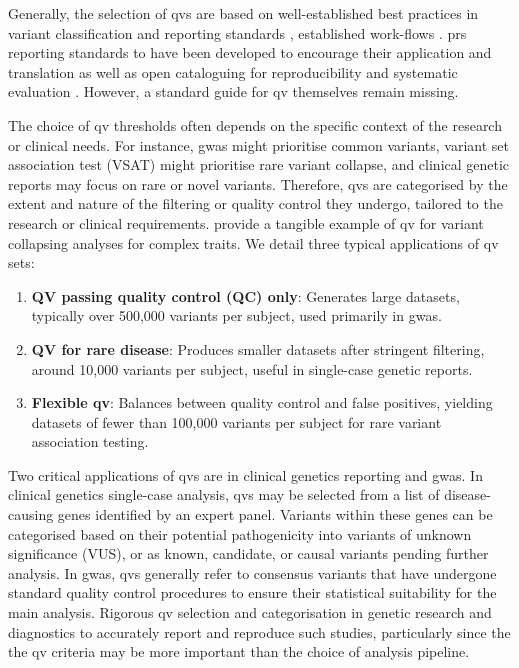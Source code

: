 Generally, the selection of \ac{qv}s are based on well-established best practices
 in variant classification and reporting standards
\cite{richards2015standards, li2017standards, li2017intervar,riggs2020technical}, 
established work-flows 
\cite{pedersen2021effective,anderson2010data,uffelmann2021genome}.
\ac{prs} reporting standards to have been developed to encourage their application and translation as well as open cataloguing for reproducibility and systematic evaluation
\cite{wand2021improving, lambert2021polygenic}.
However, a standard guide for \ac{qv} themselves remain missing.

The choice of \ac{qv} thresholds often depends on the specific context of the research or clinical needs. 
For instance, \ac{gwas} might prioritise common variants, 
variant set association test (VSAT) might prioritise rare variant collapse, 
and clinical genetic reports may focus on rare or novel variants. 
Therefore, \ac{qv}s are categorised by the extent and nature of the filtering or quality control they undergo, tailored to the research or clinical requirements. 
\citet{povysil2019rare} provide a tangible example of \ac{qv} for variant collapsing analyses for complex traits.
We detail three typical applications of \ac{qv} sets:

\begin{enumerate}
    \item \textbf{QV passing quality control (QC) only}: Generates large datasets, typically over 500,000 variants per subject, used primarily in \ac{gwas}.
    \item \textbf{QV for rare disease}: Produces smaller datasets after stringent filtering, around 10,000 variants per subject, useful in single-case genetic reports.
    \item \textbf{Flexible \ac{qv}}: Balances between quality control and false positives, yielding datasets of fewer than 100,000 variants per subject for rare variant association testing.
\end{enumerate}

Two critical applications of  \ac{qv}s are in clinical genetics reporting and \ac{gwas}. 
In clinical genetics single-case analysis, \ac{qv}s may be selected from a list of disease-causing genes identified by an expert panel. 
Variants within these genes can be categorised based on their potential pathogenicity into variants of unknown significance (VUS), or as known, candidate, or causal variants pending further analysis. 
In \ac{gwas}, \ac{qv}s generally refer to consensus variants that have undergone standard quality control procedures to ensure their statistical suitability for the main analysis.
Rigorous \ac{qv} selection and categorisation in genetic research and diagnostics to accurately report and reproduce such studies, particularly since the the \ac{qv} criteria may be more important than the choice of analysis pipeline. 

